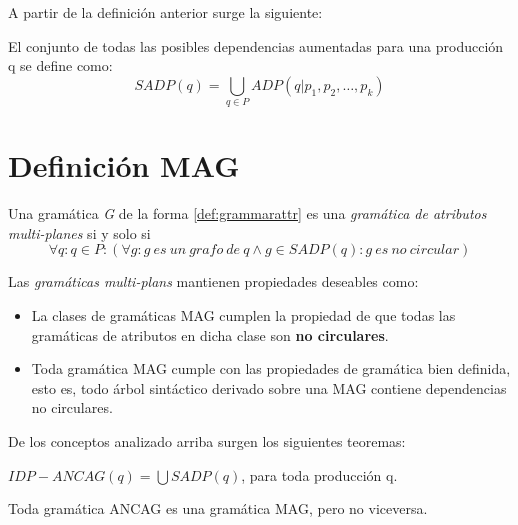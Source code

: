 A partir de la definición anterior surge la siguiente:
\begin{definition}
El conjunto de todas las posibles dependencias aumentadas para una producción q se define como:
\begin{equation}
SADP(q) = \bigcup\limits_{q\in P}{ADP (q | p_{1}, p_{2}, \dots, p_{k})} 
\end{equation}
\end{definition}

\section{Definición MAG}

Una gramática \textit{G} de la forma \ref{def:grammarattr} es una \textit{gramática de atributos multi-planes} si y solo si 
\begin{equation}
\forall q : q \in P: (\forall g:g\ es\ un\ grafo\ de\ q \wedge g \in SADP(q) : g\ es\ no\ circular) 
\end{equation}

Las \textit{gramáticas multi-plans} mantienen propiedades deseables como:
\begin{itemize}
\item La clases de gramáticas MAG cumplen la propiedad de que todas las gramáticas de atributos en dicha clase son \textbf{no circulares}.
\item Toda gramática MAG cumple con las propiedades de gramática bien definida, esto es, todo árbol sintáctico derivado sobre una MAG contiene dependencias no circulares.
\end{itemize}

De los conceptos analizado arriba surgen los siguientes teoremas:

\begin{theorem}
$IDP-ANCAG(q) = \bigcup SADP(q)$, para toda producción q. 
\end{theorem}

\begin{theorem}
Toda gramática ANCAG es una gramática MAG, pero no viceversa.
\end{theorem}

